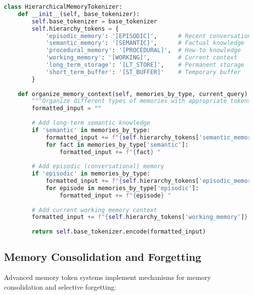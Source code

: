 \begin{lstlisting}[language=Python, caption=Hierarchical memory token system]
class HierarchicalMemoryTokenizer:
    def __init__(self, base_tokenizer):
        self.base_tokenizer = base_tokenizer
        self.hierarchy_tokens = {
            'episodic_memory': '[EPISODIC]',      # Recent conversational memory
            'semantic_memory': '[SEMANTIC]',      # Factual knowledge
            'procedural_memory': '[PROCEDURAL]',  # How-to knowledge
            'working_memory': '[WORKING]',        # Current context
            'long_term_storage': '[LT_STORE]',    # Permanent storage
            'short_term_buffer': '[ST_BUFFER]'    # Temporary buffer
        }
    
    def organize_memory_context(self, memories_by_type, current_query):
        """Organize different types of memories with appropriate tokens"""
        formatted_input = ""
        
        # Add long-term semantic knowledge
        if 'semantic' in memories_by_type:
            formatted_input += f"{self.hierarchy_tokens['semantic_memory']} "
            for fact in memories_by_type['semantic']:
                formatted_input += f"{fact} "
        
        # Add episodic (conversational) memory
        if 'episodic' in memories_by_type:
            formatted_input += f"{self.hierarchy_tokens['episodic_memory']} "
            for episode in memories_by_type['episodic']:
                formatted_input += f"{episode} "
        
        # Add current working memory context
        formatted_input += f"{self.hierarchy_tokens['working_memory']} {current_query}"
        
        return self.base_tokenizer.encode(formatted_input)
\end{lstlisting}

\subsection{Memory Consolidation and Forgetting}

Advanced memory token systems implement mechanisms for memory consolidation and selective forgetting:

